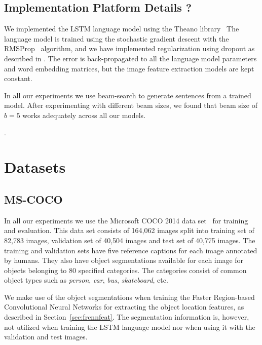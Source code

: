 \subsection{Implementation Platform Details ?}
\label{subsec:implDetails}
We implemented the LSTM language model using the Theano library~%
The language model is trained using the stochastic gradient descent with the
RMSProp~\cite{rmspropTielman} algorithm, and we have implemented regularization
using dropout as described in \cite{ZarembaSV14}.
The error is back-propagated to all the language model parameters and word
embedding matrices, but the image feature extraction models are kept constant.

In all our experiments we use beam-search to generate sentences from a trained
model.
After experimenting with different beam sizes, we found that beam size of $b=5$
works adequately across all our models.

\cite{Bastien-Theano-2012}.
\section{Datasets}
\subsection{MS-COCO}
In all our experiments we use the Microsoft COCO 2014
data set~\cite{Lin2014} for training and evaluation.
This data set consists of 164,062 images split into training set of
82,783 images, validation set of 40,504 images and test set of 40,775
images. 
The training and validation sets have five reference captions for each
image annotated by humans. 
They also have object segmentations available for each image for
objects belonging to 80 specified categories.
The categories consist of common object types such as \emph{person},
\emph{car}, \emph{bus}, \emph{skateboard}, etc.

We make use of the object segmentations when training the Faster
Region-based Convolutional Neural Networks for extracting the object
location features, as described in Section~\ref{sec:frcnnfeat}.
The segmentation information is, however, not utilized when training
the LSTM language model nor when using it with the validation and test
images.

